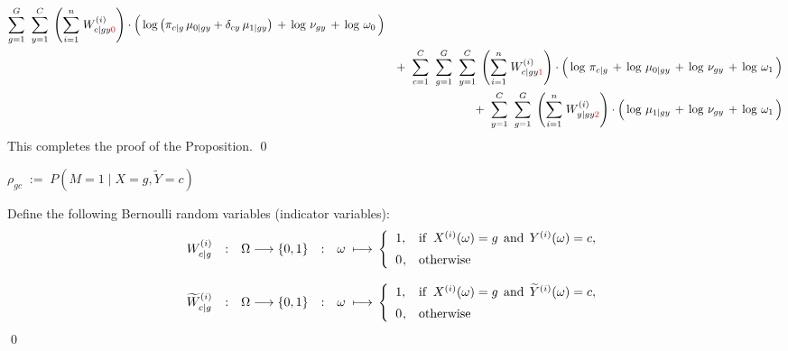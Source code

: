\begin{eqnarray*}
	\overset{G}{\underset{g=1}{\sum}}\;\;
	\overset{C}{\underset{y=1}{\sum}}\;
	\left(\overset{n}{\underset{i=1}{\sum}}\;W^{(i)}_{c \vert gy{\color{red}0}}\right)
	\cdot
	\left(\,
		\log\left(\pi_{c \vert g}\,\mu_{0 \vert gy} + \delta_{cy}\,\mu_{1\vert gy}\right)
		\,\overset{{\color{white}.}}{+}\,
		\log\,\nu_{gy}
		\,\overset{{\color{white}.}}{+}\,
		\log\,\omega_{0}
	\,\right)
\\
&&
	+ \;\;
	\overset{C}{\underset{c=1}{\sum}}\;\;
	\overset{G}{\underset{g=1}{\sum}}\;\;
	\overset{C}{\underset{y=1}{\sum}}\;
	\left(\overset{n}{\underset{i=1}{\sum}}\;W^{(i)}_{c \vert gy{\color{red}1}}\right)
	\cdot
	\left(\,
		\log\,\pi_{c \vert g}
		\,\overset{{\color{white}.}}{+}\,
		\log\,\mu_{0\vert gy}
		\,\overset{{\color{white}.}}{+}\,
		\log\,\nu_{gy}
		\,\overset{{\color{white}.}}{+}\,
		\log\,\omega_{1}
	\,\right)
\\
&&
	+ \;\;
	\overset{C}{\underset{y=1}{\sum}}\;\;
	\overset{G}{\underset{g=1}{\sum}}\;
	\left(\overset{n}{\underset{i=1}{\sum}}\;W^{(i)}_{y \vert gy{\color{red}2}}\right)
	\cdot
	\left(\,
		\log\,\mu_{1 \vert gy}
		\,\overset{{\color{white}.}}{+}\,
		\log\,\nu_{gy}
		\,\overset{{\color{white}.}}{+}\,
		\log\,\omega_{1}
	\,\right)
\end{eqnarray*}
This completes the proof of the Proposition.
\qed

$\rho_{gc} \;:=\; P\!\left(M=1\;\vert\;X=g,\widetilde{Y}=c\right)$

\vskip 0.3cm
\noindent
Define the following Bernoulli random variables (indicator variables):
\begin{equation*}
\begin{array}{ccccl}
	W^{(i)}_{c \vert g} &:& \Omega \longrightarrow \{0,1\} &:& \omega\;\longmapsto\,
	\left\{
		\begin{array}{cl}
		1, & \textnormal{if}\;\; X^{(i)}(\omega) = g \,\;\textnormal{and}\;\, Y^{(i)}(\omega) = c,
		\\
		\overset{{\color{white}-}}{0}, & \textnormal{otherwise}
		\end{array}
	\right.
\\ \\
	\widetilde{W}^{(i)}_{c \vert g} &:& \Omega \longrightarrow \{0,1\} &:& \omega\;\longmapsto\,
	\left\{
		\begin{array}{cl}
		1, & \textnormal{if}\;\; X^{(i)}(\omega) = g \,\;\textnormal{and}\;\, \widetilde{Y}^{(i)}(\omega) = c,
		\\
		\overset{{\color{white}-}}{0}, & \textnormal{otherwise}
		\end{array}
	\right.
\end{array}
\end{equation*}
\qed

